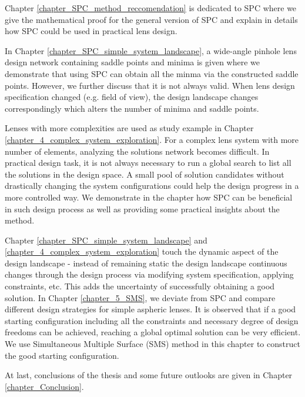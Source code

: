 Chapter \ref{chapter_SPC_method_reccomendation} is dedicated to SPC where we give the mathematical proof for the general version of SPC and explain in details how SPC could be used in practical lens design. 

In Chapter \ref{chapter_SPC_simple_system_landscape}, a wide-angle pinhole lens design network containing saddle points and minima is given where we demonstrate that using SPC can obtain all the minma via the constructed saddle points. However, we further discuss that it is not always valid. When lens design specification changed (e.g. field of view), the design landscape changes correspondingly which alters the number of minima and saddle points. 

Lenses with more complexities are used as study example in Chapter \ref{chapter_4_complex_system_exploration}. For a complex lens system with more number of elements, analyzing the solutions network becomes difficult. In practical design task, it is not always necessary to run a global search to list all the solutions in the design space. A small pool of solution candidates without drastically changing the system configurations could help the design progress in a more controlled way. We demonstrate in the chapter how SPC can be beneficial in such design process as well as providing some practical insights about the method. 

Chapter \ref{chapter_SPC_simple_system_landscape} and \ref{chapter_4_complex_system_exploration} touch the dynamic aspect of the design landscape - instead of remaining static the design landscape continuous changes through the design process via modifying system specification, applying constraints, etc. This adds the uncertainty of successfully obtaining a good solution.  In Chapter \ref{chapter_5_SMS}, we deviate from SPC and compare different design strategies for simple aspheric lenses. It is observed that if a good starting configuration including all the constraints and necessary degree of design freedoms can be achieved, reaching a global optimal solution can be very efficient. We use Simultaneous Multiple Surface (SMS) method in this chapter to construct the good starting configuration. 

At last, conclusions of the thesis and some future outlooks are given in Chapter \ref{chapter_Conclusion}.


